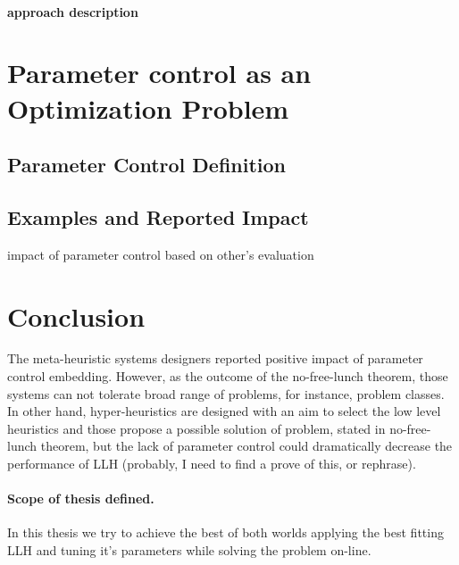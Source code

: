 \paragraph{approach description}


\section{Parameter control as an Optimization Problem}\label{bg: parameter control}
\subsection{Parameter Control Definition}
\subsection{Examples and Reported Impact}
impact of parameter control based on other's evaluation


\section{Conclusion}

The meta-heuristic systems designers reported positive impact of parameter control embedding. 
However, as the outcome of the no-free-lunch theorem, those systems can not tolerate broad range of problems, for instance, problem classes.
In other hand, hyper-heuristics are designed with an aim to select the low level heuristics and those propose a possible solution of problem, stated in no-free-lunch theorem, but the lack of parameter control could dramatically decrease the performance of LLH (probably, I need to find a prove of this, or rephrase).

\paragraph{Scope of thesis defined.} In this thesis we try to achieve the best of both worlds applying the best fitting LLH and tuning it's parameters while solving the problem on-line.
